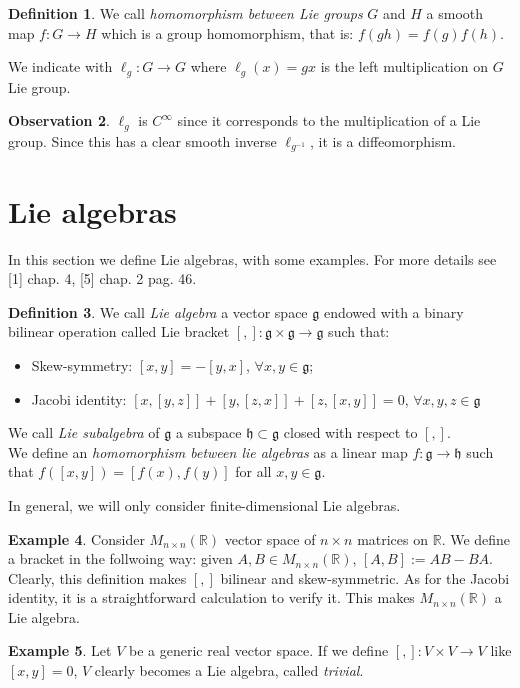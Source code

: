 \documentclass[12pt,a4paper]{report}
\theoremstyle{definition}
\newtheorem{Def}{Definition}[chapter]
\theoremstyle{Theorem}
\theoremstyle{definition}
\newtheorem{Ex}[Def]{Example}
\theoremstyle{definition}
\newtheorem{Obs}[Def]{Observation}
\begin{document}
	\begin{Def}
		We call \textit{homomorphism between Lie groups} $G$ and $H$ a smooth map $f:G\rightarrow H$ which is a group homomorphism, that is: $f(gh)=f(g)f(h)$.
	\end{Def}
	We indicate with $\ell_g:G\rightarrow G$ where $\ell_g(x)=gx$ is the left multiplication on $G$ Lie group.
	\begin{Obs}
		$\ell_g$ is $C^\infty$ since it corresponds to the multiplication of a Lie group. Since this has a clear smooth inverse $\ell_{g^{-1}}$, it is a diffeomorphism.
	\end{Obs}
	\section{Lie algebras}
	In this section we define Lie algebras, with some examples. For more details see [1] chap. 4, [5] chap. 2 pag. 46.
	\begin{Def}
		We call \textit{Lie algebra} a vector space $\mathfrak{g}$ endowed with a binary bilinear operation called Lie bracket $[,]:\mathfrak{g}\times\mathfrak{g}\rightarrow\mathfrak{g}$ such that:
		\begin{itemize}
			\item Skew-symmetry: $[x,y]=-[y,x]$, $\forall x,y\in\mathfrak{g}$;
			\item Jacobi identity: $[x,[y,z]]+[y,[z,x]]+[z,[x,y]]=0$, $\forall x,y,z\in \mathfrak{g}$ 
		\end{itemize}
		We call \textit{Lie subalgebra} of $\mathfrak{g}$ a subspace $\mathfrak{h}\subset\mathfrak{g}$ closed with respect to $[,]$.\\
		We define an \textit{homomorphism between lie algebras} as a linear map $f:\mathfrak{g}\rightarrow\mathfrak{h}$ such that $f([x,y])=[f(x),f(y)]$ for all $x,y\in\mathfrak{g}$.
	\end{Def}
	In general, we will only consider finite-dimensional Lie algebras.
	\begin{Ex} \label{Obs: bracket Mnn}
		Consider $M_{n\times n}(\mathbb{R})$ vector space of $n\times n$ matrices on $\mathbb{R}$. We define a bracket in the follwoing way: given $A,B\in M_{n\times n}(\mathbb{R})$, $[A,B]:= AB-BA$. Clearly, this definition makes $[,]$ bilinear and skew-symmetric. As for the Jacobi identity, it is a straightforward calculation to verify it. This makes $M_{n\times n}(\mathbb{R})$ a Lie algebra. 
	\end{Ex}
	\begin{Ex}
		Let $V$ be a generic real vector space. If we define $[,]:V\times V\rightarrow V$ like $[x,y]=0$, $V$ clearly becomes a Lie algebra, called \textit{trivial}.
	\end{Ex}
\end{document}
